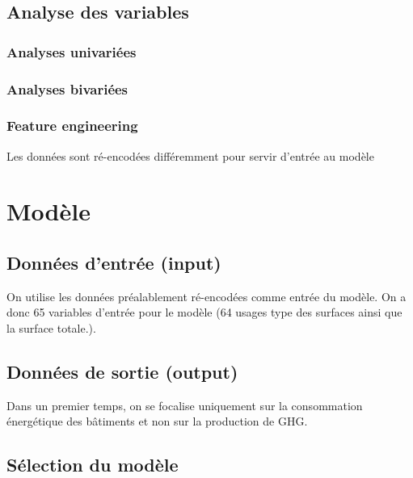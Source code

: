 \subsection{Analyse des variables}

\subsubsection{Analyses univariées}

\subsubsection{Analyses bivariées}

\subsubsection{Feature engineering}

Les données sont ré-encodées différemment pour servir d'entrée au modèle




\section{Modèle}


\subsection{Données d'entrée (input)}

On utilise les données préalablement ré-encodées comme entrée du modèle.
On a donc 65 variables d'entrée pour le modèle (64 usages type des surfaces ainsi
que la surface totale.).

\subsection{Données de sortie (output)}

Dans un premier temps, on se focalise uniquement sur la consommation énergétique
des bâtiments et non sur la production de GHG.

\subsection{Sélection du modèle}

